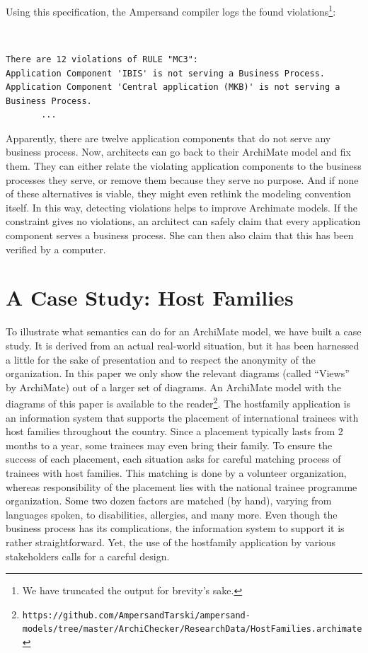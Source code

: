 \documentclass[sn-vancouver]{sn-jnl}%
\begin{document}
Using this specification, the Ampersand compiler logs the found violations\footnote{We have truncated the output for brevity's sake.}:
{\tt\small
\begin{lstlisting}[frame=single, label={log}, caption={}]
There are 12 violations of RULE "MC3":
Application Component 'IBIS' is not serving a Business Process.
Application Component 'Central application (MKB)' is not serving a Business Process.
       ...
\end{lstlisting}
}
Apparently, there are twelve application components that do not serve any business process.
Now, architects can go back to their ArchiMate model and fix them.
They can either relate the violating application components to the business processes they serve, or remove them because they serve no purpose.
And if none of these alternatives is viable, they might even rethink the modeling convention itself.
In this way, detecting violations helps to improve Archimate models.
If the constraint gives no violations, an architect can safely claim that every application component serves a business process.
She can then also claim that this has been verified by a computer.

\section{A Case Study: Host Families}\label{host families}
To illustrate what semantics can do for an ArchiMate model, we have built a case study.
It is derived from an actual real-world situation,
but it has been harnessed a little for the sake of presentation and to respect the anonymity of the organization.
In this paper we only show the relevant diagrams (called ``Views'' by ArchiMate) out of a larger set of diagrams.
An ArchiMate model with the diagrams of this paper is available to the reader\footnote{\tt\tiny https://github.com/AmpersandTarski/ampersand-models/tree/master/ArchiChecker/ResearchData/HostFamilies.archimate}.
The hostfamily application is an information system that supports the placement of international trainees with host families throughout the country.
Since a placement typically lasts from 2 months to a year, some trainees may even bring their family.
To ensure the success of each placement, each situation asks for careful matching process of trainees with host families.
This matching is done by a volunteer organization, whereas responsibility of the placement lies with the national trainee programme organization.
Some two dozen factors are matched (by hand), varying from languages spoken, to disabilities, allergies, and many more.
Even though the business process has its complications, the information system to support it is rather straightforward.
Yet, the use of the hostfamily application by various stakeholders calls for a careful design.
\end{document}
